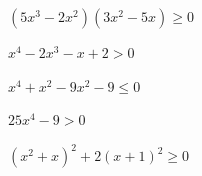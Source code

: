 \begin{esercizio}[*]
\begin{enumeratea}
\item \(\left(5x^3-2x^2\right)\left(3x^2-5x\right) \geqslant 0\) 
\item \(x^4-2x^3-x+2>0\) 
\item \(x^4+x^2-9x^2-9 \leqslant 0\) 
\item \(25x^4-9>0\) 
\item \(\left(x^2+x\right)^2+2\left(x+1\right)^2 \geqslant 0\) 
\sol{\R}
\end{enumeratea}
\end{esercizio}
% 
% 
